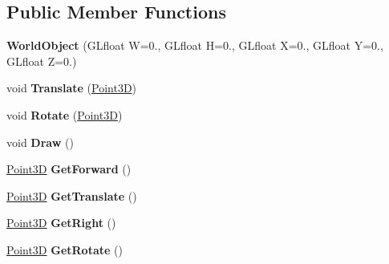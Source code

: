 \subsection*{Public Member Functions}
\begin{DoxyCompactItemize}
\item 
\hypertarget{class_world_object_a464fd2e8938ae8ca4e778235819d616a}{{\bfseries World\+Object} (G\+Lfloat W=0., G\+Lfloat H=0., G\+Lfloat X=0., G\+Lfloat Y=0., G\+Lfloat Z=0.)}\label{class_world_object_a464fd2e8938ae8ca4e778235819d616a}

\item 
\hypertarget{class_world_object_ab70b8fbf6ec1c1d9fe6a95c791c321f3}{void {\bfseries Translate} (\hyperlink{struct_point3_d}{Point3\+D})}\label{class_world_object_ab70b8fbf6ec1c1d9fe6a95c791c321f3}

\item 
\hypertarget{class_world_object_adc741ef57132da4aa8cbac78db3fff26}{void {\bfseries Rotate} (\hyperlink{struct_point3_d}{Point3\+D})}\label{class_world_object_adc741ef57132da4aa8cbac78db3fff26}

\item 
\hypertarget{class_world_object_ae46caed8b37233c2b9e0383a26cb9f87}{void {\bfseries Draw} ()}\label{class_world_object_ae46caed8b37233c2b9e0383a26cb9f87}

\item 
\hypertarget{class_world_object_a3a3158dc13f636eb3835e22fdc32a7b9}{\hyperlink{struct_point3_d}{Point3\+D} {\bfseries Get\+Forward} ()}\label{class_world_object_a3a3158dc13f636eb3835e22fdc32a7b9}

\item 
\hypertarget{class_world_object_aff5a65911deeaedf114357217d16c66f}{\hyperlink{struct_point3_d}{Point3\+D} {\bfseries Get\+Translate} ()}\label{class_world_object_aff5a65911deeaedf114357217d16c66f}

\item 
\hypertarget{class_world_object_aba6fb82b134193bdcb5882a7e83e937a}{\hyperlink{struct_point3_d}{Point3\+D} {\bfseries Get\+Right} ()}\label{class_world_object_aba6fb82b134193bdcb5882a7e83e937a}

\item 
\hypertarget{class_world_object_a443ed580b100165115e4fd2d7cdaae43}{\hyperlink{struct_point3_d}{Point3\+D} {\bfseries Get\+Rotate} ()}\label{class_world_object_a443ed580b100165115e4fd2d7cdaae43}

\end{DoxyCompactItemize}
